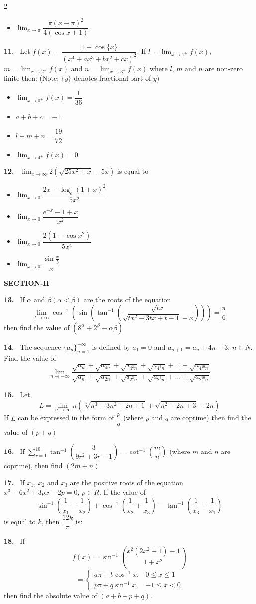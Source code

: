 \documentclass[10pt]{extarticle}
\newcommand{\sect}[1]{\par\smallskip\noindent\textbf{#1}\par}
\newcommand{\qn}[1]{\par\smallskip\noindent\textbf{#1.}~}
\newenvironment{qoptions}{\begin{itemize}[leftmargin=1.8em,itemsep=1pt,topsep=2pt,label={}]}{\end{itemize}}
\newcommand{\opt}[2]{\item[(#1)] #2}
\begin{document}
\begin{multicols}{2}
\begin{qoptions}
\opt{D}{$\displaystyle\lim_{x\to\pi}\dfrac{\pi(x-\pi)^2}{4(\cos x+1)}$}
\end{qoptions}
\qn{11} Let $f(x)=\dfrac{1-\cos\{x\}}{(x^4+ax^3+bx^2+cx)^2}$. If $l=\displaystyle\lim_{x\to1^+}f(x)$, $m=\displaystyle\lim_{x\to2^+}f(x)$ and $n=\displaystyle\lim_{x\to3^+}f(x)$ where $l$, $m$ and $n$ are non-zero finite then: (Note: $\{y\}$ denotes fractional part of $y$)
\begin{qoptions}
\opt{A}{$\displaystyle\lim_{x\to0^+}f(x)=\dfrac1{36}$}
\opt{B}{$a+b+c=-1$}
\opt{C}{$l+m+n=\dfrac{19}{72}$}
\opt{D}{$\displaystyle\lim_{x\to4^+}f(x)=0$}
\end{qoptions}
\qn{12} $\displaystyle\lim_{x\to\infty}2\left(\sqrt{25x^2+x}-5x\right)$ is equal to
\begin{qoptions}
\opt{A}{$\displaystyle\lim_{x\to0}\dfrac{2x-\log_e(1+x)^2}{5x^2}$}
\opt{B}{$\displaystyle\lim_{x\to0}\dfrac{e^{-x}-1+x}{x^2}$}
\opt{C}{$\displaystyle\lim_{x\to0}\dfrac{2(1-\cos x^2)}{5x^4}$}
\opt{D}{$\displaystyle\lim_{x\to0}\dfrac{\sin\frac x5}{x}$}
\end{qoptions}
\sect{SECTION-II}
\qn{13} If $\alpha$ and $\beta(\alpha<\beta)$ are the roots of the equation
{\small\[\lim_{t\to\infty}\cos^{-1}\left(\sin\left(\tan^{-1}\left(\dfrac{\sqrt{tx}}{\sqrt{tx^2-3tx+t-1}-x}\right)\right)\right)=\dfrac\pi6\]}
then find the value of $(8^{\alpha}+2^{\beta}-\alpha\beta)$
\qn{14} The sequence $\{a_n\}_{n=1}^{+\infty}$ is defined by $a_1=0$ and $a_{n+1}=a_n+4n+3$, $n\in N$. Find the value of
{\small\[\lim_{n\to+\infty}\dfrac{\sqrt{a_n}+\sqrt{a_{4n}}+\sqrt{a_{4^2n}}+\sqrt{a_{4^3n}}+\ldots+\sqrt{a_{4^{10}n}}}{\sqrt{a_n}+\sqrt{a_{2n}}+\sqrt{a_{2^2n}}+\sqrt{a_{2^3n}}+\ldots+\sqrt{a_{2^{10}n}}}\]}
\qn{15} Let {\small\[L=\lim_{n\to\infty}n\left(\sqrt[3]{n^3+3n^2+2n+1}+\sqrt{n^2-2n+3}-2n\right)\]} If $L$ can be expressed in the form of $\dfrac pq$ (where $p$ and $q$ are coprime) then find the value of $(p+q)$
\qn{16} If $\displaystyle\sum_{r=1}^{10}\tan^{-1}\left(\dfrac{3}{9r^2+3r-1}\right)=\cot^{-1}\left(\dfrac mn\right)$ (where $m$ and $n$ are coprime), then find $(2m+n)$
\qn{17} If $x_1$, $x_2$ and $x_3$ are the positive roots of the equation $x^3-6x^2+3px-2p=0$, $p\in R$. If the value of {\small\[\sin^{-1}\left(\dfrac1{x_1}+\dfrac1{x_2}\right)+\cos^{-1}\left(\dfrac1{x_2}+\dfrac1{x_3}\right)-\tan^{-1}\left(\dfrac1{x_3}+\dfrac1{x_1}\right)\]} is equal to $k$, then $\dfrac{12k}{\pi}$ is:
\qn{18} If {\small\[f(x)=\sin^{-1}\left(\dfrac{x^2(2x^2+1)-1}{1+x^2}\right)\]\[=\begin{cases}a\pi+b\cos^{-1}x,&0\le x\le1\\ p\pi+q\sin^{-1}x,&-1\le x<0\end{cases}\]} then find the absolute value of $(a+b+p+q)$.
\end{multicols}
\end{document}

